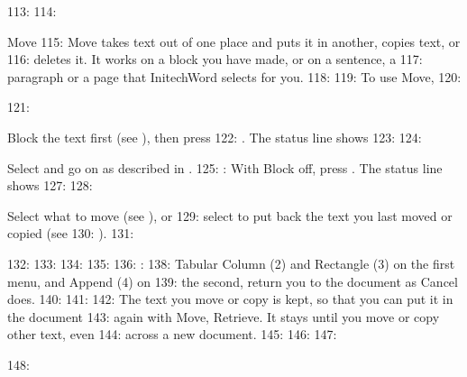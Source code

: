 113: 
114: \begin{Feature}{Move}
115: Move takes text out of one place and puts it in another, copies text, or
116: deletes it.  It works on a block you have made, or on a sentence, a
117: paragraph or a page that InitechWord selects for you.
118: 
119: To use Move,
120: \begin{WPSteps}
121: \item Block the text first (see ), then press
122: .  The status line shows
123: 
124: \par Select  and go on as described in .
125: : With Block off, press .  The status line shows
127: 
128: \par Select what to move (see ), or
129: select  to put back the text you last moved or copied (see
130: ).
131: \end{WPSteps}
132: 
133: 
134: 
135: 
136: : 
138: Tabular Column (2) and Rectangle (3) on the first menu, and Append (4) on
139: the second, return you to the document as Cancel does.
140: 
141: 
142: The text you move or copy is kept, so that you can put it in the document
143: again with Move, Retrieve.  It stays until you move or copy other text, even
144: across a new document.
145: 
146: 
147: \end{Feature}
148: 
